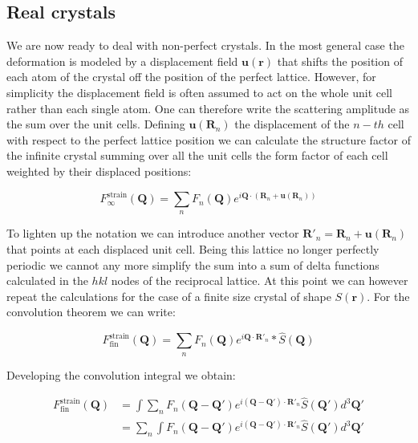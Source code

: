 \subsection{Real crystals}
We are now ready to deal with non-perfect crystals. In the most general case the deformation is modeled by a displacement field $\mathbf{u(r)}$ 
that shifts the position of each atom of the crystal off the position of the perfect lattice. However, for simplicity 
the displacement field is often assumed to act on the whole unit cell rather than each single atom. One can therefore 
write the scattering amplitude as the sum over the unit cells. 
Defining $\mathbf{u}(\mathbf{R}_n)$ the displacement of the $n-th$ cell with respect to the perfect lattice position 
we can calculate the structure factor of the infinite crystal summing over all the unit cells the form factor of each cell weighted by 
their displaced positions: 

\begin{equation}
    F^{\text{strain}}_{\infty}(\mathbf{Q}) = 
    \sum_{n} F_n(\mathbf{Q}) e^{i \mathbf{Q} \cdot (\mathbf{R}_n + \mathbf{u}(\mathbf{R}_n))}
   \label{eq:strain1}
\end{equation} 

To lighten up the notation we can introduce another vector $\mathbf{R}'_n = \mathbf{R}_n + \mathbf{u}(\mathbf{R}_n)$ that 
points at each displaced unit cell. Being this lattice no longer perfectly periodic we cannot any more simplify the sum 
into a sum of delta functions calculated in the $hkl$ nodes of the reciprocal lattice. 
At this point we can however repeat the calculations for the case of a finite size crystal of shape $S(\mathbf{r})$. 
For the convolution theorem we can write: 

\begin{equation}
    F^{\text{strain}}_{\text{fin}}(\mathbf{Q}) = 
    \sum_{n} F_n(\mathbf{Q}) e^{i \mathbf{Q} \cdot \mathbf{R}'_n} \ast \widehat{S}(\mathbf{Q})
   \label{eq:strain_fin}
\end{equation}

Developing the convolution integral we obtain: 

\begin{equation}
    \begin{aligned}
    F^{\text{strain}}_{\text{fin}}(\mathbf{Q}) &= 
    \int \sum_{n} F_n(\mathbf{Q} -\mathbf{Q'}) e^{i (\mathbf{Q}-\mathbf{Q'}) \cdot \mathbf{R}'_n} \widehat{S}(\mathbf{Q'})d^3\mathbf{Q'} \\
    &= \sum_{n} \int F_n(\mathbf{Q} -\mathbf{Q'}) e^{i (\mathbf{Q}-\mathbf{Q'}) \cdot \mathbf{R}'_n} \widehat{S}(\mathbf{Q'})d^3\mathbf{Q'} \\ 
   \label{eq:strain_fin2}
    \end{aligned}
\end{equation}

